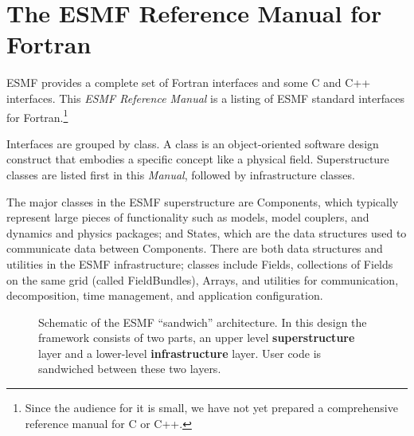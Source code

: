 



\section{The ESMF Reference Manual for Fortran}

ESMF provides a complete set of Fortran interfaces and
some C and C++ interfaces.  This {\it ESMF Reference Manual} is a listing of 
ESMF standard interfaces for Fortran.\footnote{Since the audience for it is 
small, we have not yet prepared a comprehensive reference manual for C 
or C++.}  

Interfaces are grouped by class.  A class is an object-oriented software 
design construct that embodies 
a specific concept like a physical field.  Superstructure classes 
are listed first in this {\it Manual}, followed by infrastructure 
classes.

The major classes in the ESMF superstructure are Components, which 
typically represent
large pieces of functionality such as models, model couplers, and 
dynamics and physics packages; and States, which are the data structures
used to communicate data between Components.  There are both data
structures and utilities in the ESMF 
infrastructure; classes include Fields, collections of Fields on the 
same grid (called FieldBundles), Arrays, and utilities for communication,
decomposition, time management, and application configuration.

\begin{center}
\begin{figure}
\caption{Schematic of the ESMF ``sandwich'' architecture. In this
design the framework consists of two parts, an upper level
{\bf superstructure} layer and a lower-level {\bf infrastructure} layer.
User code is sandwiched between these two layers.}
\label{fig:TheESMFwich}
\end{figure}
\end{center}

